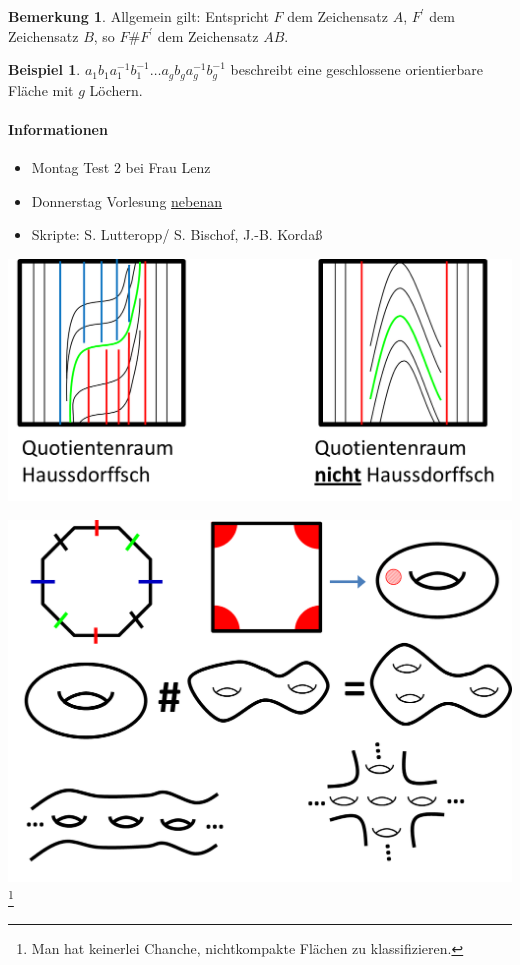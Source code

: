 \documentclass[a4paper,11pt,notitlepage]{report}
\theoremstyle{definition}
\newtheorem{remark}{Bemerkung}[chapter]
\newtheorem{example}{Beispiel}[chapter]
\begin{document}
\begin{remark}
	Allgemein gilt: Entspricht $F$ dem Zeichensatz $A$, $F^\prime$ dem Zeichensatz $B$, so $F \# F^\prime$ dem Zeichensatz $AB$.
\end{remark}

\begin{example}
	$a_1 b_1 a_1^{-1} b_1^{-1} \ldots a_g b_g a_g^{-1} b_g^{-1}$ beschreibt eine geschlossene orientierbare Fläche mit $g$ Löchern.
\end{example}


\paragraph{Informationen}
\begin{itemize}
	\item Montag Test 2 bei Frau Lenz
	\item Donnerstag Vorlesung \underline{nebenan}
	\item Skripte: S. Lutteropp/ S. Bischof, J.-B. Kordaß
\end{itemize}

\begin{center}
	\includegraphics[scale=0.5]{images/2012_01_12_Bild1.png}
\end{center}

\begin{center}
	\includegraphics[scale=0.5]{images/2012_01_12_Bild2.png}
	\footnote{Man hat keinerlei Chanche, nichtkompakte Flächen zu klassifizieren.}
\end{center}
\end{document}
